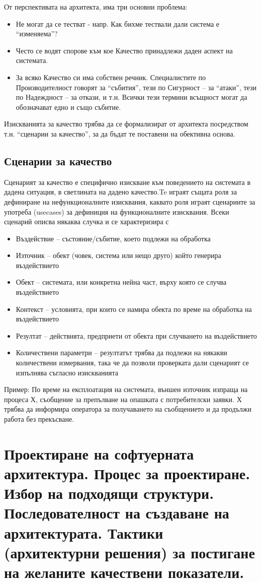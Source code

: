 \documentclass[fleqn,12pt]{article}
\begin{document}
От перспективата на архитекта, има три основни проблема:
\begin {itemize}
\item Не могат да се тестват - напр. Как бихме тествали дали система е “изменяема”?
\item Често се водят спорове към кое Качество принадлежи даден аспект на системата.
\item За всяко Качество си има собствен речник. Специалистите по Производителност говорят за “събития”, тези по Сигурност – за “атаки”, тези по Надеждност – за откази, и т.н. Всички тези термини всъщност могат да обозначават едно и също събитие.
\end {itemize}

Изискванията за качество трябва да се формализират от архитекта посредством т.н. “сценарии за качество”, за да бъдат те поставени на обективна основа. 

\subsection {Сценарии за качество}
Сценарият за качество е специфично изискване към поведението на системата в дадена ситуация, в светлината на дадено качество.Te играят същата роля за дефиниране на нефункционалните изисквания, каквато роля играят сценариите за употреба (usecases) за дефиниция на функционалните изисквания.  Всеки сценарий описва някаква случка и се характеризира с 
\begin {itemize}
\item Въздействие – състояние/събитие, което подлежи на обработка 
\item Източник – обект (човек, система или нещо друго) който генерира въздействието
\item Обект – системата, или конкретна нейна част, върху която се случва въздействието
\item Контекст – условията, при които се намира обекта по време на обработка на въздействието
\item Резултат – действията, предприети от обекта при случването на въздействието
\item Количествени параметри – резултатът трябва да подлежи на някакви количествени измервания, така че да позволи проверката дали сценарият се изпълнява съгласно изискванията
\end{itemize}
Пример: По време на експлоатация на системата, външен източник изпраща на процеса Х, съобщение за препълване на опашката с потребителски заявки. Х трябва да информира оператора за получаването на съобщението и да продължи работа без прекъсване.

\section{Проектиране на софтуерната архитектура. Процес за проектиране. Избор на
подходящи структури. Последователност на създаване на архитектурата.
Тактики (архитектурни решения) за постигане на желаните качествени
показатели.}
\section{}
\end{document}
